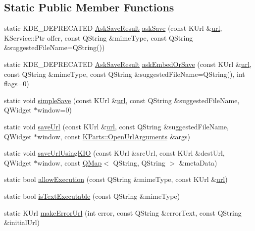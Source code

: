 \subsection*{Static Public Member Functions}
\begin{DoxyCompactItemize}
\item 
static K\+D\+E\+\_\+\+D\+E\+P\+R\+E\+C\+A\+T\+E\+D \hyperlink{classKParts_1_1BrowserRun_a32ee53f65c723ec01f4c4c28e91db8e6}{Ask\+Save\+Result} \hyperlink{classKParts_1_1BrowserRun_a240c17aac1cd740315731916f0616723}{ask\+Save} (const K\+Url \&\hyperlink{classKParts_1_1BrowserRun_ad3f7d10647ab8b5a77399f46df92046b}{url}, K\+Service\+::\+Ptr offer, const Q\+String \&mime\+Type, const Q\+String \&suggested\+File\+Name=Q\+String())
\item 
static K\+D\+E\+\_\+\+D\+E\+P\+R\+E\+C\+A\+T\+E\+D \hyperlink{classKParts_1_1BrowserRun_a32ee53f65c723ec01f4c4c28e91db8e6}{Ask\+Save\+Result} \hyperlink{classKParts_1_1BrowserRun_a548576ed0ee79c29f1b68d16922ae6bd}{ask\+Embed\+Or\+Save} (const K\+Url \&\hyperlink{classKParts_1_1BrowserRun_ad3f7d10647ab8b5a77399f46df92046b}{url}, const Q\+String \&mime\+Type, const Q\+String \&suggested\+File\+Name=Q\+String(), int flags=0)
\item 
static void \hyperlink{classKParts_1_1BrowserRun_a38a97c58c4a3bb15e3de9e5cdf7fb24a}{simple\+Save} (const K\+Url \&\hyperlink{classKParts_1_1BrowserRun_ad3f7d10647ab8b5a77399f46df92046b}{url}, const Q\+String \&suggested\+File\+Name, Q\+Widget $\ast$window=0)
\item 
static void \hyperlink{classKParts_1_1BrowserRun_a75d80364750fd734cabccaa8a818a48d}{save\+Url} (const K\+Url \&\hyperlink{classKParts_1_1BrowserRun_ad3f7d10647ab8b5a77399f46df92046b}{url}, const Q\+String \&suggested\+File\+Name, Q\+Widget $\ast$window, const \hyperlink{classKParts_1_1OpenUrlArguments}{K\+Parts\+::\+Open\+Url\+Arguments} \&args)
\item 
static void \hyperlink{classKParts_1_1BrowserRun_a76f09a0166b39cf15e02df97765d8d0a}{save\+Url\+Using\+K\+I\+O} (const K\+Url \&src\+Url, const K\+Url \&dest\+Url, Q\+Widget $\ast$window, const \hyperlink{classQMap}{Q\+Map}$<$ Q\+String, Q\+String $>$ \&meta\+Data)
\item 
static bool \hyperlink{classKParts_1_1BrowserRun_adc6f66d941b8361b6808f4d6dcee312b}{allow\+Execution} (const Q\+String \&mime\+Type, const K\+Url \&\hyperlink{classKParts_1_1BrowserRun_ad3f7d10647ab8b5a77399f46df92046b}{url})
\item 
static bool \hyperlink{classKParts_1_1BrowserRun_a5e9221ceeeaddac5b6f0929c9298afa6}{is\+Text\+Executable} (const Q\+String \&mime\+Type)
\item 
static K\+Url \hyperlink{classKParts_1_1BrowserRun_a07ae3b98d8050e48980711788c2b84d8}{make\+Error\+Url} (int error, const Q\+String \&error\+Text, const Q\+String \&initial\+Url)
\end{DoxyCompactItemize}
